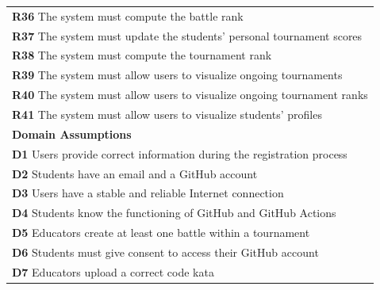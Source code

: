 \begin{table}[H]
    \begin{tabularx}{\textwidth}{X}
        \textbf{R36} The system must compute the battle rank     \\  
        \textbf{R37} The system must update the students' personal tournament scores         \\ 
        \textbf{R38} The system must compute the tournament rank         \\
        \textbf{R39} The system must allow users to visualize ongoing tournaments    \\
        \textbf{R40} The system must allow users to visualize ongoing tournament ranks       \\
        \textbf{R41} The system must allow users to visualize students' profiles     \\
        \midrule
        \textbf{Domain Assumptions}                                                                                                  \\ \midrule
        \textbf{D1} Users provide correct information during the registration process \\
        \textbf{D2} Students have an email and a GitHub account     \\
        \textbf{D3} Users have a stable and reliable Internet connection \\
        \textbf{D4} Students know the functioning of GitHub and GitHub Actions      \\
        \textbf{D5} Educators create at least one battle within a tournament        \\
        \textbf{D6} Students must give consent to access their GitHub account       \\
        \textbf{D7} Educators upload a correct code kata        \\
        \bottomrule
    \end{tabularx}
\end{table}

